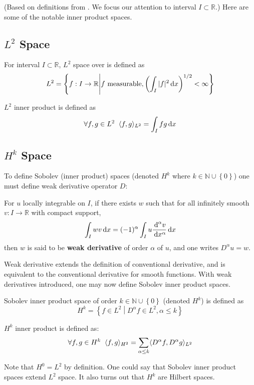 \documentclass[../dissertation.tex]{subfiles}
\begin{document}
(Based on definitions from \cite{nspde}.
We focus our attention to interval $I \subset \mathbb{R}$.)
Here are some of the notable inner product spaces.
\subsection{$L^2$ Space}
\begin{definition}[$L^2$ Space]
    For interval $I \subset \mathbb{R}$,
    $L^2$ space over is defined as
    \begin{equation}
        L^2 = \left\{ f:I \rightarrow \mathbb{R} \middle| f \text{ measurable}, \left( \int_{I} |f|^2 \, \text{d} x \right)^{1/2} < \infty  \right\}
    \end{equation}

    $L^2$ inner product is defined as
    \begin{equation}
        \forall f,g \in L^2 \; \; \langle f, g \rangle_{L^2} = \int_I f g \, \text{d} x
    \end{equation}
\end{definition}

\subsection{$H^k$ Space}
To define Sobolev (inner product) spaces (denoted $H^k$ where $k \in \mathbb{N} \cup \left\{ 0 \right\}$)
one must define weak derivative operator $D$:
\begin{definition}
    For $u$ locally integrable on $I$, if there exists $w$ such that for all infinitely smooth $v:I \rightarrow \mathbb{R}$ with compact support,
    \begin{equation}
        \int_{I} w v \, \text{d} x = (-1)^{\alpha} \int_{I} u \frac{\, \text{d}^{\alpha} v}{\, \text{d} x^{\alpha}} \, \text{d} x
    \end{equation}
    then $w$ is said to be \textbf{weak derivative} of order $\alpha$ of $u$, and one writes $D^{\alpha}u = w$.
\end{definition}

Weak derivative extends the definition of conventional derivative, and is equivalent to the conventional derivative for smooth functions.
With weak derivatives introduced, one may now define Sobolev inner product spaces.
\begin{definition}[$H^k$ Space]
    Sobolev inner product space of order $k \in \mathbb{N} \cup \left\{ 0 \right\}$ (denoted $H^k$) is defined as
    \begin{equation}
        H^k = \left\{ f \in L^2 \left.\middle|\right. D^{\alpha} f \in L^2, \alpha \leq k \right\}
    \end{equation}

    $H^k$ inner product is defined as:
    \begin{equation}
        \forall f,g \in H^{k} \; \; \langle f, g \rangle_{H^2} = \sum_{\alpha \leq k} \langle D^\alpha f, D^\alpha g \rangle_{L^2}
    \end{equation}
\end{definition}

\begin{remark}
    Note that $H^0 = L^2$ by definition.
    One could say that Sobolev inner product spaces extend $L^2$ space.
    It also turns out that $H^k$ are Hilbert spaces.
\end{remark}
\end{document}
